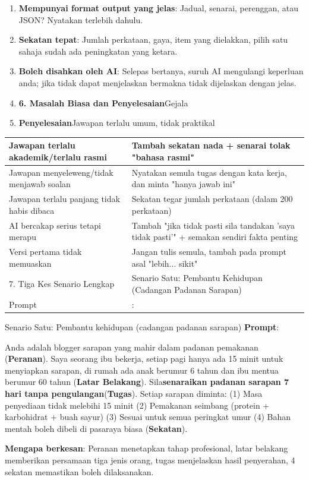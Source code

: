 \begin{enumerate}
  \item \textbf{Mempunyai format output yang jelas}: Jadual, senarai, perenggan, atau JSON? Nyatakan terlebih dahulu.
  \item \textbf{Sekatan tepat}: Jumlah perkataan, gaya, item yang dielakkan, pilih satu sahaja sudah ada peningkatan yang ketara.
  \item \textbf{Boleh disahkan oleh AI}: Selepas bertanya, suruh AI mengulangi keperluan anda; jika tidak dapat menjelaskan bermakna tidak dijelaskan dengan jelas.
  \item \textbf{6. Masalah Biasa dan Penyelesaian}Gejala
  \item \textbf{Penyelesaian}Jawapan terlalu umum, tidak praktikal
\end{enumerate}


\begin{center}
\begin{tabularx}{\linewidth}{|X|X|}
\hline
\textbf{Jawapan terlalu akademik/terlalu rasmi} & \textbf{Tambah sekatan nada + senarai tolak "bahasa rasmi"} \tabularnewline
\hline
Jawapan menyeleweng/tidak menjawab soalan & Nyatakan semula tugas dengan kata kerja, dan minta "hanya jawab ini" \tabularnewline
Jawapan terlalu panjang tidak habis dibaca & Sekatan tegar jumlah perkataan (dalam 200 perkataan) \tabularnewline
AI bercakap serius tetapi merapu & Tambah "jika tidak pasti sila tandakan 'saya tidak pasti'" + semakan sendiri fakta penting \tabularnewline
Versi pertama tidak memuaskan & Jangan tulis semula, tambah pada prompt asal "lebih... sikit" \tabularnewline
7. Tiga Kes Senario Lengkap & Senario Satu: Pembantu Kehidupan (Cadangan Padanan Sarapan) \tabularnewline
Prompt & : \tabularnewline
\hline
\end{tabularx}
\end{center}


\begin{tcbinfo}{Senario Satu: Pembantu kehidupan (cadangan padanan sarapan)}
\textbf{Prompt}:

Anda adalah blogger sarapan yang mahir dalam padanan pemakanan (\textbf{Peranan}). Saya seorang ibu bekerja, setiap pagi hanya ada 15 minit untuk menyiapkan sarapan, di rumah ada anak berumur 6 tahun dan ibu mentua berumur 60 tahun (\textbf{Latar Belakang}). Sila\textbf{senaraikan padanan sarapan 7 hari tanpa pengulangan}(\textbf{Tugas}). Setiap sarapan diminta: (1) Masa penyediaan tidak melebihi 15 minit (2) Pemakanan seimbang (protein + karbohidrat + buah sayur) (3) Sesuai untuk semua peringkat umur (4) Bahan mentah boleh dibeli di pasaraya biasa (\textbf{Sekatan}).

\textbf{Mengapa berkesan}: Peranan menetapkan tahap profesional, latar belakang memberikan persamaan tiga jenis orang, tugas menjelaskan hasil penyerahan, 4 sekatan memastikan boleh dilaksanakan.

\end{tcbinfo}


